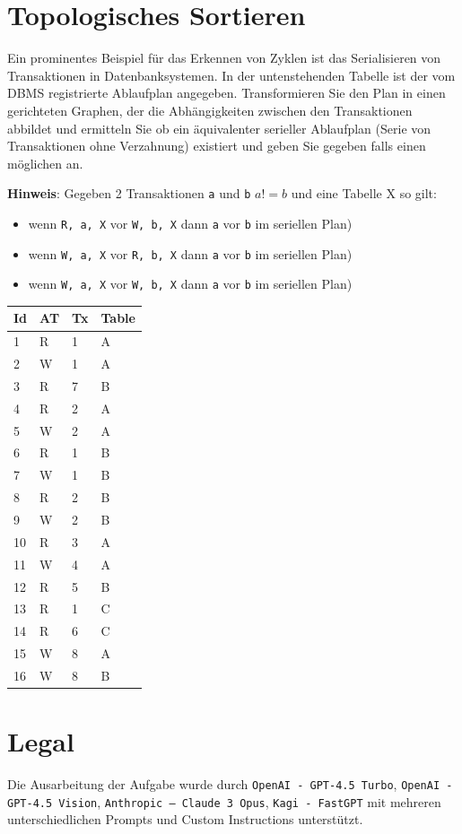 \documentclass[a4paper,11pt]{report}
\begin{document}
\chapter{Topologisches Sortieren}
Ein prominentes Beispiel für das Erkennen von Zyklen ist das Serialisieren von Transaktionen in Datenbanksystemen.
In der untenstehenden Tabelle ist der vom DBMS registrierte Ablaufplan angegeben.
Transformieren Sie den Plan in einen gerichteten Graphen, der die Abhängigkeiten zwischen den Transaktionen abbildet und ermitteln Sie ob ein äquivalenter serieller Ablaufplan
(Serie von Transaktionen ohne Verzahnung)
existiert und geben Sie gegeben falls einen möglichen an.

\textbf{Hinweis}: Gegeben 2 Transaktionen \texttt{a} und \texttt{b} $a != b$ und eine Tabelle X so gilt:

\begin{itemize}
    \item wenn \texttt{R, a, X} vor \texttt{W, b, X} dann \texttt{a} vor \texttt{b} im seriellen Plan)
    \item wenn \texttt{W, a, X} vor \texttt{R, b, X} dann \texttt{a} vor \texttt{b} im seriellen Plan)
    \item wenn \texttt{W, a, X} vor \texttt{W, b, X} dann \texttt{a} vor \texttt{b} im seriellen Plan)
\end{itemize}

\begin{table}[]
    \begin{tabular}{|l|l|l|l|}
        \hline
        Id & AT & Tx & Table \\ \hline
        1  & R  & 1  & A     \\ \hline
        2  & W  & 1  & A     \\ \hline
        3  & R  & 7  & B     \\ \hline
        4  & R  & 2  & A     \\ \hline
        5  & W  & 2  & A     \\ \hline
        6  & R  & 1  & B     \\ \hline
        7  & W  & 1  & B     \\ \hline
        8  & R  & 2  & B     \\ \hline
        9  & W  & 2  & B     \\ \hline
        10 & R  & 3  & A     \\ \hline
        11 & W  & 4  & A     \\ \hline
        12 & R  & 5  & B     \\ \hline
        13 & R  & 1  & C     \\ \hline
        14 & R  & 6  & C     \\ \hline
        15 & W  & 8  & A     \\ \hline
        16 & W  & 8  & B     \\ \hline
    \end{tabular}
\end{table}

\begin{figure}[]
\end{figure}

\chapter{Legal}
Die Ausarbeitung der Aufgabe wurde durch \texttt{OpenAI - GPT-4.5 Turbo}, \texttt{OpenAI - GPT-4.5 Vision}, \texttt{Anthropic -- Claude 3 Opus},  \texttt{Kagi - FastGPT} mit mehreren unterschiedlichen Prompts und Custom Instructions unterstützt.
\end{document}
